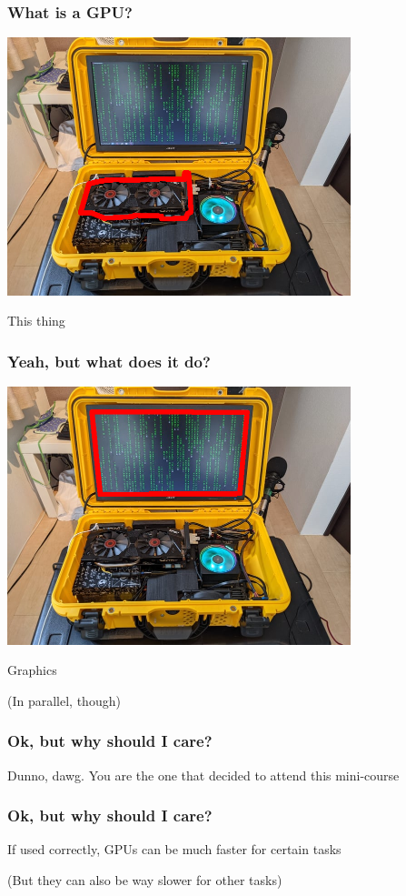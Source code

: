 \documentclass{beamer}
\begin{document}
\begin{frame}
\frametitle{What is a GPU?}
\pause
\begin{center}
\includegraphics[width=0.75\textwidth]{wiag.png}
\end{center}
\center \Huge This thing
\end{frame}

\begin{frame}
\frametitle{Yeah, but what does it do?}
\pause
\begin{center}
\includegraphics[width=0.75\textwidth]{ybwdid.png}
\end{center}
\center \Huge Graphics

\pause
\center \small (In parallel, though)
\end{frame}

\begin{frame}
\frametitle{Ok, but why should I care?}
\pause

\center \Huge Dunno, dawg. You are the one that decided to attend this mini-course
\end{frame}

\begin{frame}
\frametitle{Ok, but why should I care?}

\center \Huge If used correctly, GPUs can be much faster for certain tasks

\pause

\center \small (But they can also be way slower for other tasks)
\end{frame}
\end{document}
